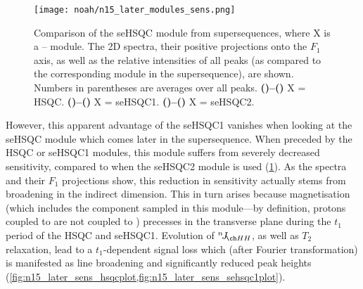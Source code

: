\begin{figure}[!ht]
    \centering
    \texttt{[image: noah/n15\_later\_modules\_sens.png]}%
    {\label{fig:n15_later_sens_hsqc}}%
    {\label{fig:n15_later_sens_hsqcp}}%
    {\label{fig:n15_later_sens_hsqcplot}}%
    {\label{fig:n15_later_sens_sehsqc1}}%
    {\label{fig:n15_later_sens_sehsqc1p}}%
    {\label{fig:n15_later_sens_sehsqc1plot}}%
    {\label{fig:n15_later_sens_sehsqc2}}%
    {\label{fig:n15_later_sens_sehsqc2p}}%
    {\label{fig:n15_later_sens_sehsqc2plot}}%
    \caption[Comparison of \carbon{} seHSQC sensitivity when preceded by different \nitrogen{} modules]{
        Comparison of the \carbon{} seHSQC module from  supersequences, where X is a \proton{}--\nitrogen{} module.
        The 2D spectra, their positive projections onto the $F_1$ axis, as well as the relative intensities of all peaks (as compared to the corresponding module in the  supersequence), are shown.
        Numbers in parentheses are averages over all peaks.
        \textbf{()--()} X = \nitrogen{} HSQC.
        \textbf{()--()} X = \nitrogen{} seHSQC1.
        \textbf{()--()} X = \nitrogen{} seHSQC2.
    }
    \label{fig:n15_later_sens}
\end{figure}

However, this apparent advantage of the seHSQC1 vanishes when looking at the \carbon{} seHSQC module which comes later in the supersequence.
When preceded by the \nitrogen{} HSQC or seHSQC1 modules, this module suffers from severely decreased sensitivity, compared to when the seHSQC2 module is used (\cref{fig:n15_later_sens}).
As the spectra and their $F_1$ projections show, this reduction in sensitivity actually stems from broadening in the indirect dimension.
This in turn arises because  magnetisation (which includes the  component sampled in this module---by definition, protons coupled to \carbon{} are not coupled to \nitrogen{}) precesses in the transverse plane during the $t_1$ period of the \nitrogen{} HSQC and seHSQC1.
Evolution of $\nJ{HH}$, as well as $T_2$ relaxation, lead to a $t_1$-dependent signal loss which (after Fourier transformation) is manifested as line broadening and significantly reduced peak heights (\cref{fig:n15_later_sens_hsqcplot,fig:n15_later_sens_sehsqc1plot}).


